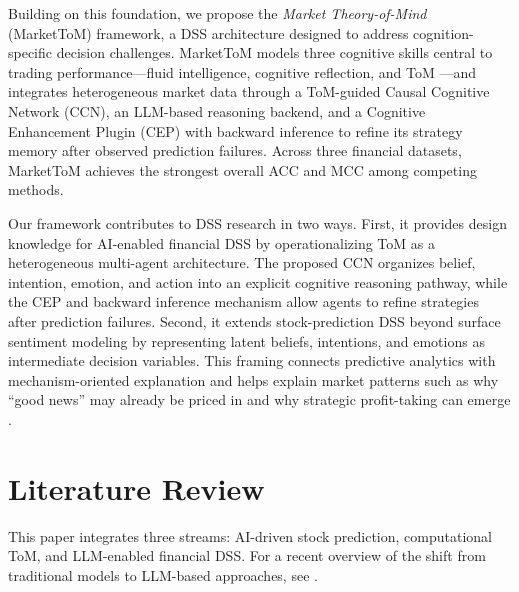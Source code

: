 \documentclass[a4paper,fleqn,doubleblind]{cas-sc}
\newcommand{\revise}[1]{{\color{blue}#1}}
\begin{document}
Building on this foundation, we propose the \textit{Market Theory-of-Mind} (MarketToM) framework, a DSS architecture designed to address cognition-specific decision challenges. MarketToM models three cognitive skills central to trading performance---fluid intelligence, cognitive reflection, and ToM \citep{corgnet2018makes}---and integrates heterogeneous market data through a ToM-guided Causal Cognitive Network (CCN), an LLM-based reasoning backend, and a Cognitive Enhancement Plugin (CEP) with backward inference to refine its strategy memory after observed prediction failures. Across three financial datasets, MarketToM achieves the strongest overall ACC and MCC among competing methods.

\revise{
Our framework contributes to DSS research in two ways. First, it provides design knowledge for AI-enabled financial DSS by operationalizing ToM as a heterogeneous multi-agent architecture. The proposed CCN organizes belief, intention, emotion, and action into an explicit cognitive reasoning pathway, while the CEP and backward inference mechanism allow agents to refine strategies after prediction failures. Second, it extends stock-prediction DSS beyond surface sentiment modeling by representing latent beliefs, intentions, and emotions as intermediate decision variables. This framing connects predictive analytics with mechanism-oriented explanation and helps explain market patterns such as why ``good news'' may already be priced in and why strategic profit-taking can emerge \citep{AbbasiEtAl2024, Tetlock2007}.
}


\section{Literature Review}\label{sec:related_work}

This paper integrates three streams: AI-driven stock prediction, computational ToM, and LLM-enabled financial DSS. For a recent overview of the shift from traditional models to LLM-based approaches, see \citet{darwish2025stock}.
\end{document}
